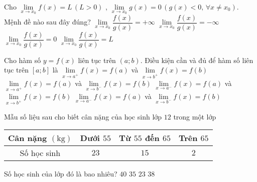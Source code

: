 \begin{ex}%
	Cho $\lim\limits_{x\to{x_0}}f(x)=L\,\left(L > 0\right)$ , $\lim\limits_{x\to{x_0}}g(x)=0\,\left(g(x) < 0,\,\forall x\ne{x_0}\right)$. Mệnh đề nào sau đây đúng?
	\choice
	{$\lim\limits_{x\to{x_0}}\dfrac{f(x)}{g(x)}=+\infty $}
	{\True $\lim\limits_{x\to{x_0}}\dfrac{f(x)}{g(x)}=-\infty $}
	{$\lim\limits_{x\to{x_0}}\dfrac{f(x)}{g(x)}=0$}
	{$\lim\limits_{x\to{x_0}}\dfrac{f(x)}{g(x)}=L$}
\end{ex}

\begin{ex}%
	Cho hàm số $y=f(x)$ liên tục trên $(a;b)$. Điều kiện cần và đủ để hàm số liên tục trên $[a;b]$ là
	\choice
	{$\lim\limits_{x\to a^+}f(x)=f(a)$ và $\lim\limits_{x\to b^+}f(x)=f(b)$}
	{\True $\lim\limits_{x\to a^+}f(x)=f(a)$ và $\lim\limits_{x\to b^-}f(x)=f(b)$}
	{$\lim\limits_{x\to a^-}f(x)=f(a)$ và $\lim\limits_{x\to b^+}f(x)=f(b)$}
	{$\lim\limits_{x\to a^-}f(x)=f(a)$ và $\lim\limits_{x\to b^-}f(x)=f(b)$}
\end{ex}

\begin{ex}%
	Mẫu số liệu sau cho biết cân nặng của học sinh lớp $12$ trong một lớp
	\begin{center}
		\begin{tabular}{|c|c|c|c|}
			\hline Cân nặng $(\mathrm{kg})$ & Dưới $55$ & Từ $55$ đến $65$ & Trên $65$ \\
			\hline Số học sinh              & $23$      & $15$             & $2$       \\
			\hline
		\end{tabular}
	\end{center}
	Số học sinh của lớp đó là bao nhiêu?
	\choice
	{\True $40$}
	{$35$}
	{$23$}
	{$38$}
\end{ex}

